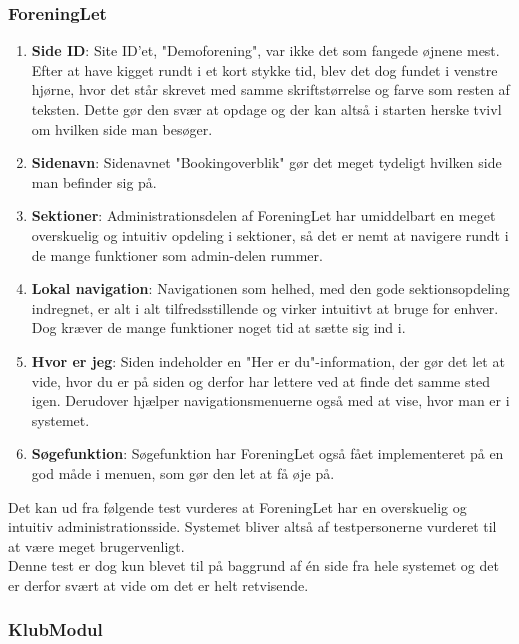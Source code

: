 \subsubsection{ForeningLet}

\begin{enumerate}
	\item \textbf{Side ID}: Site ID'et, "Demoforening", var ikke det som fangede øjnene mest. Efter at have kigget rundt i et kort stykke tid, blev det dog fundet i venstre hjørne, hvor det står skrevet med samme skriftstørrelse og farve som resten af teksten. Dette gør den svær at opdage og der kan altså i starten herske tvivl om hvilken side man besøger.
	\item \textbf{Sidenavn}: Sidenavnet "Bookingoverblik" gør det meget tydeligt hvilken side man befinder sig på.
	\item \textbf{Sektioner}: Administrationsdelen af ForeningLet har umiddelbart en meget overskuelig og intuitiv opdeling i sektioner, så det er nemt at navigere rundt i de mange funktioner som admin-delen rummer.
	\item \textbf{Lokal navigation}: Navigationen som helhed, med den gode sektionsopdeling indregnet, er alt i alt tilfredsstillende og virker intuitivt at bruge for enhver. Dog kræver de mange funktioner noget tid at sætte sig ind i.
	\item \textbf{Hvor er jeg}: Siden indeholder en "Her er du"\mbox{}-information, der gør det let at vide, hvor du er på siden og derfor har lettere ved at finde det samme sted igen. Derudover hjælper navigationsmenuerne også med at vise, hvor man er i systemet.
	\item \textbf{Søgefunktion}: Søgefunktion har ForeningLet også fået implementeret på en god måde i menuen, som gør den let at få øje på.
\end{enumerate}

Det kan ud fra følgende test vurderes at ForeningLet har en overskuelig og intuitiv administrationsside. Systemet bliver altså af testpersonerne vurderet til at være meget brugervenligt.\\

Denne test er dog kun blevet til på baggrund af én side fra hele systemet og det er derfor svært at vide om det er helt retvisende.

\subsubsection{KlubModul}


